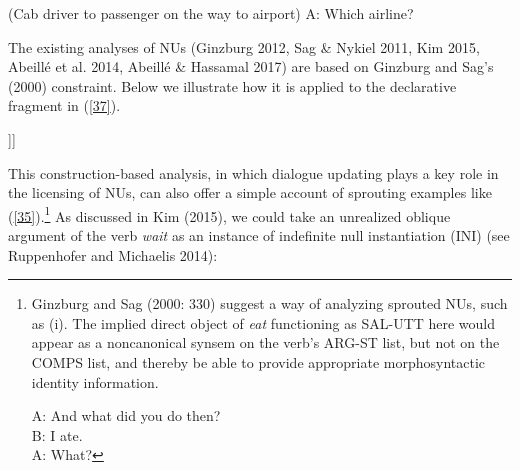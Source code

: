 \documentclass[output=paper]{langsci/langscibook}
\begin{document}
{  \ea (Cab driver to passenger on the way to airport) A: Which airline?\label{40}\z

The existing analyses of NUs (Ginzburg 2012, Sag \& Nykiel 2011, Kim 2015, Abeill\'{e} et al. 2014, Abeill\'{e} \& Hassamal 2017) are based on Ginzburg and Sag's (2000) constraint. Below we illustrate how it is applied to the declarative fragment in (\ref{37}).

\ea\label{41}
\begin{forest}
[\begin{avm}\avml \hfil S\\
\[CAT &\[HEAD v\]\\
 CTXT & \[MAX-QUD $\lambda$\{$\pi$$^{i}$\}\[{\it break}({\it b,i})\]\\
  SAL-UTT \{\[CAT\ \@2\\
                          CONT & \[IND & {\it i}\\
                                 \] \]\}\]\]  \avmr \end{avm}
[\begin{avm}\avml \hfil NP\\
             \[CAT  \@2\\
  CONT & \[IND & {\it i}%
   \]\]\avmr\end{avm}
 [The mike]]]
\end{forest}
\z  

This construction-based analysis, in which dialogue updating plays
a key role in the licensing of NUs, can also offer a simple account of
sprouting examples like (\ref{35}).\footnote{Ginzburg and Sag (2000: 330) suggest a way of analyzing sprouted NUs, such as (i). The implied direct object of {\it eat} functioning as SAL-UTT here would appear as a noncanonical synsem on the verb's ARG-ST list, but not on the COMPS list, and thereby be able to provide appropriate morphosyntactic identity information.

\ea  A: And what did you do then? \\B: I ate. \\A: What?\z


} As discussed in Kim (2015), we could take an unrealized oblique argument of
the verb {\it wait} as an instance of indefinite null instantiation (INI) (see Ruppenhofer and Michaelis 2014):

}
\end{document}
